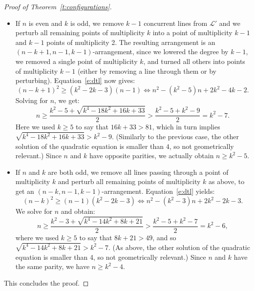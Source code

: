 \documentclass[10pt,a4paper]{amsart}
\renewcommand{\L}{\mathcal{L}}
\begin{document}
\begin{proof}[Proof of Theorem~\ref{t:configurations}]
\begin{itemize}
\item If $n$ is even and $k$ is odd, we remove $k-1$ concurrent lines from $\L'$ and we perturb all remaining points of multiplicity $k$ into a point of multiplicity $k-1$ and $k-1$ points of multiplicity 2. The resulting arrangement is an $(n-k+1,n-1,k-1)$-arrangement, since we lowered the degree by $k-1$, we removed a single point of multiplicity $k$, and turned all others into points of multiplicity $k-1$ (either by removing a line through them or by perturbing). Equation~\eqref{e:dtl} now gives:
\[
(n-k+1)^2 \ge (k^2-2k-3)(n-1)  \Longleftrightarrow  n^2 - (k^2-5)n + 2k^2-4k-2.
\]
Solving for $n$, we get:
\[
n \ge \frac{k^2 - 5 + \sqrt{k^4-18k^2 + 16k + 33}}2 > \frac{k^2 - 5 + k^2- 9}2 = k^2-7.
\]
Here we used $k \ge 5$ to say that $16k+33 > 81$, which in turn implies $\sqrt{k^4-18k^2 + 16k + 33} > k^2-9$.
(Similarly to the previous case, the other solution of the quadratic equation is smaller than $4$, so not geometrically relevant.)
Since $n$ and $k$ have opposite parities, we actually obtain $n \ge k^2-5$.

\item If $n$ and $k$ are both odd, we remove all lines passing through a point of multiplicity $k$ and perturb all remaining points of multiplicity $k$ as above, to get an $(n-k,n-1,k-1)$-arrangement.
Equation~\eqref{e:dtl} yields:
\[
(n-k)^2 \ge (n-1)(k^2-2k-3) \Longleftrightarrow n^2 - (k^2-3)n + 2k^2-2k-3.
\]
We solve for $n$ and obtain:
\[
n \ge \frac{k^2 - 3 + \sqrt{k^4-14k^2 + 8k + 21}}2 > \frac{k^2 - 5 + k^2- 7}2 = k^2-6,
\]
where we used $k \ge 5$ to say that $8k+21 > 49$, and so $\sqrt{k^4-14k^2 + 8k + 21} > k^2-7$.
(As above, the other solution of the quadratic equation is smaller than 4, so not geometrically relevant.)
Since $n$ and $k$ have the same parity, we have $n \ge k^2-4$.
\end{itemize}
This concludes the proof.
\end{proof}
\end{document}

